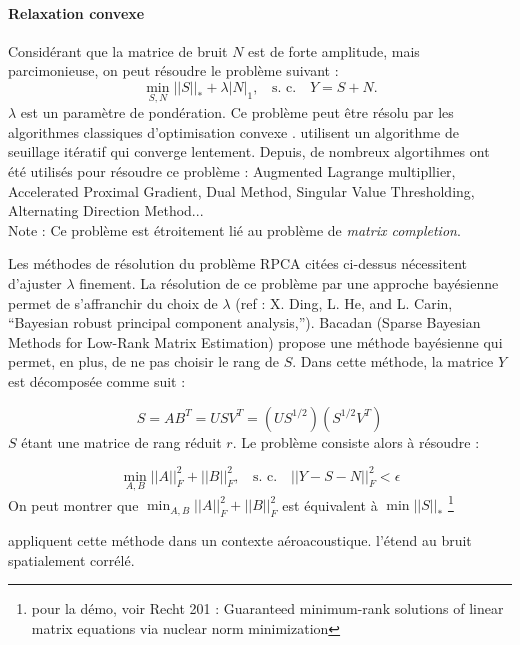 \paragraph{\tbullet Relaxation convexe}

Considérant que la matrice de bruit $N$  est de forte amplitude, mais parcimonieuse, on peut résoudre le problème suivant \citep{Wright2009a} : 
\begin{equation}
    \min_{S,N} ||S||_* + \lambda|N|_1,~~~~\text{s. c.~~~}Y=S+N.
\end{equation}
$\lambda$ est un paramètre de pondération.
Ce problème peut être résolu par les algorithmes classiques d'optimisation convexe .
 \cite{Wright2009a} utilisent un algorithme de seuillage itératif qui converge lentement. Depuis, de nombreux algortihmes ont été utilisés pour résoudre ce problème :  Augmented Lagrange multipllier,  Accelerated Proximal Gradient,  Dual Method, Singular Value Thresholding, Alternating Direction Method...\\
 
 Note : Ce problème est étroitement lié au problème de \textit{matrix completion}.	

Les méthodes de résolution du problème RPCA citées ci-dessus nécessitent d'ajuster $\lambda$  finement. La résolution de ce problème par une approche bayésienne permet de s'affranchir du choix de $\lambda$ (ref : X. Ding, L. He, and L. Carin, “Bayesian robust principal component  analysis,”). Bacadan (Sparse Bayesian Methods for Low-Rank Matrix Estimation) propose une méthode bayésienne qui permet, en plus, de ne pas choisir le rang de $S$. Dans cette méthode, la matrice $Y$ est décomposée comme suit : 

\begin{equation}
    S=AB^T = USV^T = \left(  US^{1/2} \right) \left(  S^{1/2}V^T \right)
\end{equation}
$S$ étant une matrice de rang réduit $r$. Le problème consiste alors à résoudre : 

\begin{equation}
    \min_{A,B} ||A||_{F}^{2}  + ||B||_{F}^{2},~~~~\text{s. c.~~~} ||Y-S-N||^2_{F} < \epsilon
\end{equation}
On peut montrer que  $\min_{A,B} ||A||_{F}^{2}  + ||B||_{F}^{2}$ est équivalent à $\min ||S||_*$ \footnote{pour la démo, voir Recht 201 : Guaranteed minimum-rank solutions of linear matrix equations via nuclear norm minimization}

\cite{finez:hal-01276687} appliquent cette méthode dans un contexte aéroacoustique. \cite{amailland2017} l'étend au bruit spatialement corrélé.\\

